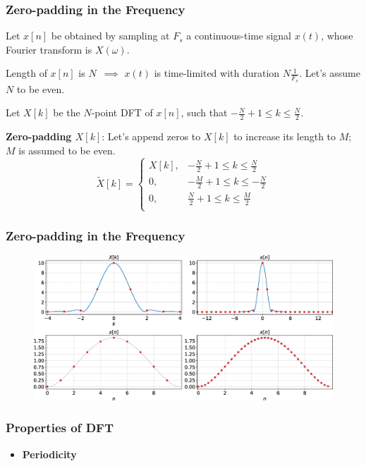 \documentclass[aspectratio=169]{beamer}
\let\olditem\item
\renewcommand{\item}{\setlength{\itemsep}{\fill}\olditem}
\begin{document}
\begin{frame}[t]
  \frametitle{Zero-padding in the Frequency}
  Let $x[n]$ be obtained by sampling at $F_s$ a continuous-time signal $x(t)$, whose Fourier transform is $X(\omega)$. 
  \vspace{0.25cm}

  Length of $x[n]$ is $N \,\,\, \implies \,\, x(t)$ is time-limited with duration $N\frac{1}{F_s}$. Let's assume $N$ to be even.
  \vspace{0.25cm}

  Let $X[k]$ be the $N$-point DFT of $x[n]$, such that $-\frac{N}{2}+1 \leq k \leq \frac{N}{2}$.
  \vspace{0.25cm}

  \textbf{Zero-padding $X[k]$}: Let's append zeros to $X[k]$ to increase its length to $M$; $M$ is assumed to be even.
  \[ \tilde{X}[k] = \begin{cases}
  X[k], & -\frac{N}{2}+1 \leq k \leq \frac{N}{2} \\ 
  0, & -\frac{M}{2}+1 \leq k \leq -\frac{N}{2} \\ 
  0, & \frac{N}{2}+1 \leq k \leq \frac{M}{2} \\ 
  \end{cases} \]
\end{frame}


\begin{frame}[t]
  \frametitle{Zero-padding in the Frequency}
  \begin{figure}
  \centering
  \includegraphics[width=1\textwidth]{img/oversampling-time.eps}
  \end{figure}
\end{frame}


\begin{frame}[t]
  \frametitle{Properties of DFT}
  \begin{itemize}
    \item \textbf{Periodicity}
  \end{itemize}
\end{frame}
\end{document}
